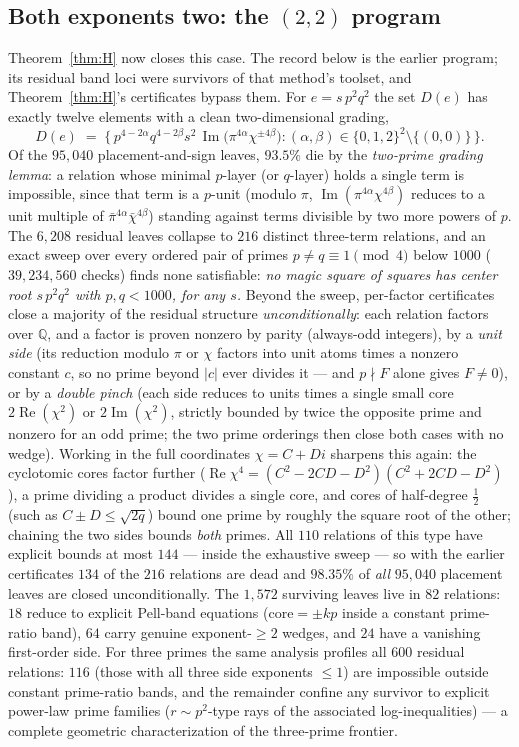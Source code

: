\documentclass[11pt]{article}
\theoremstyle{remark}
\DeclareMathOperator{\im}{Im}
\DeclareMathOperator{\re}{Re}
\begin{document}
\subsection*{Both exponents two: the $(2,2)$ program}

Theorem~\ref{thm:H} now closes this case.  The record below is the earlier
program; its residual band loci were survivors of that method's toolset, and
Theorem~\ref{thm:H}'s certificates bypass them.  For $e = s\,p^2q^2$ the set
$D(e)$ has exactly twelve elements with a clean two-dimensional grading,
\[
D(e) \;=\; \bigl\{\, p^{4-2\alpha}q^{4-2\beta}s^2\,
\im\!\bigl(\pi^{4\alpha}\chi^{\pm4\beta}\bigr)
: (\alpha,\beta)\in\{0,1,2\}^2\setminus\{(0,0)\}\,\bigr\}.
\]
Of the $95{,}040$ placement-and-sign leaves, $93.5\%$ die by the
\emph{two-prime grading lemma}: a relation whose minimal $p$-layer (or
$q$-layer) holds a single term is impossible, since that term is a
$p$-unit (modulo $\pi$, $\im(\pi^{4\alpha}\chi^{4\beta})$ reduces to a
unit multiple of $\bar\pi^{4\alpha}\bar\chi^{4\beta}$) standing against
terms divisible by two more powers of $p$.  The $6{,}208$ residual
leaves collapse to $216$ distinct three-term relations, and an exact
sweep over every ordered pair of primes $p\ne q\equiv 1\pmod 4$ below
$1000$ ($39{,}234{,}560$ checks) finds none satisfiable: \emph{no magic
square of squares has center root $s\,p^2q^2$ with $p,q<1000$, for any
$s$.}  Beyond the sweep, per-factor certificates close a majority of the
residual structure \emph{unconditionally}: each relation factors over
$\mathbb{Q}$, and a factor is proven nonzero by parity (always-odd
integers), by a \emph{unit side} (its reduction modulo $\pi$ or
$\chi$ factors into unit atoms times a nonzero constant $c$, so no
prime beyond $|c|$ ever divides it — and $p \nmid F$ alone gives
$F \ne 0$), or by a \emph{double pinch} (each side reduces to units
times a single small core $2\re(\chi^2)$ or $2\im(\chi^2)$,
strictly bounded by twice the opposite prime and nonzero for an odd
prime; the two prime orderings then close both cases with no wedge).
Working in the full coordinates $\chi = C+Di$ sharpens this again:
the cyclotomic cores factor further
($\re\chi^4 = (C^2-2CD-D^2)(C^2+2CD-D^2)$), a prime dividing a
product divides a single core, and cores of half-degree $\tfrac12$
(such as $C\pm D \le \sqrt{2q}$) bound one prime by roughly the
square root of the other; chaining the two sides bounds \emph{both}
primes.  All $110$ relations of this type have explicit bounds at most
$144$ — inside the exhaustive sweep — so with the earlier certificates
$134$ of the $216$ relations are dead and $98.35\%$ of \emph{all}
$95{,}040$ placement leaves are closed unconditionally.  The $1{,}572$
surviving leaves live in $82$ relations: $18$ reduce to explicit
Pell-band equations ($\mathrm{core} = \pm kp$ inside a constant
prime-ratio band), $64$ carry genuine exponent-$\ge 2$ wedges, and
$24$ have a vanishing first-order side.  For three primes the same
analysis profiles all $600$ residual relations: $116$ (those with all
three side exponents $\le 1$) are impossible outside constant
prime-ratio bands, and the remainder confine any survivor to explicit
power-law prime families ($r \sim p^2$-type rays of the associated
log-inequalities) — a complete geometric characterization of the
three-prime frontier.
\end{document}
